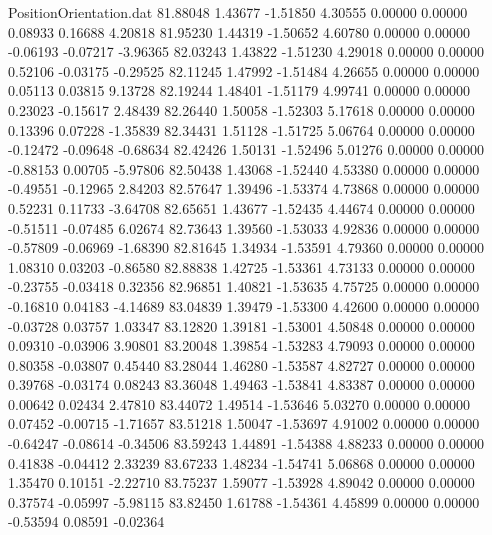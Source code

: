 \begin{filecontents}{PositionOrientation.dat}
  81.88048    1.43677   -1.51850     4.30555    0.00000    0.00000    0.08933    0.16688    4.20818
  81.95230    1.44319   -1.50652     4.60780    0.00000    0.00000   -0.06193   -0.07217   -3.96365
  82.03243    1.43822   -1.51230     4.29018    0.00000    0.00000    0.52106   -0.03175   -0.29525
  82.11245    1.47992   -1.51484     4.26655    0.00000    0.00000    0.05113    0.03815    9.13728
  82.19244    1.48401   -1.51179     4.99741    0.00000    0.00000    0.23023   -0.15617    2.48439
  82.26440    1.50058   -1.52303     5.17618    0.00000    0.00000    0.13396    0.07228   -1.35839
  82.34431    1.51128   -1.51725     5.06764    0.00000    0.00000   -0.12472   -0.09648   -0.68634
  82.42426    1.50131   -1.52496     5.01276    0.00000    0.00000   -0.88153    0.00705   -5.97806
  82.50438    1.43068   -1.52440     4.53380    0.00000    0.00000   -0.49551   -0.12965    2.84203
  82.57647    1.39496   -1.53374     4.73868    0.00000    0.00000    0.52231    0.11733   -3.64708
  82.65651    1.43677   -1.52435     4.44674    0.00000    0.00000   -0.51511   -0.07485    6.02674
  82.73643    1.39560   -1.53033     4.92836    0.00000    0.00000   -0.57809   -0.06969   -1.68390
  82.81645    1.34934   -1.53591     4.79360    0.00000    0.00000    1.08310    0.03203   -0.86580
  82.88838    1.42725   -1.53361     4.73133    0.00000    0.00000   -0.23755   -0.03418    0.32356
  82.96851    1.40821   -1.53635     4.75725    0.00000    0.00000   -0.16810    0.04183   -4.14689
  83.04839    1.39479   -1.53300     4.42600    0.00000    0.00000   -0.03728    0.03757    1.03347
  83.12820    1.39181   -1.53001     4.50848    0.00000    0.00000    0.09310   -0.03906    3.90801
  83.20048    1.39854   -1.53283     4.79093    0.00000    0.00000    0.80358   -0.03807    0.45440
  83.28044    1.46280   -1.53587     4.82727    0.00000    0.00000    0.39768   -0.03174    0.08243
  83.36048    1.49463   -1.53841     4.83387    0.00000    0.00000    0.00642    0.02434    2.47810
  83.44072    1.49514   -1.53646     5.03270    0.00000    0.00000    0.07452   -0.00715   -1.71657
  83.51218    1.50047   -1.53697     4.91002    0.00000    0.00000   -0.64247   -0.08614   -0.34506
  83.59243    1.44891   -1.54388     4.88233    0.00000    0.00000    0.41838   -0.04412    2.33239
  83.67233    1.48234   -1.54741     5.06868    0.00000    0.00000    1.35470    0.10151   -2.22710
  83.75237    1.59077   -1.53928     4.89042    0.00000    0.00000    0.37574   -0.05997   -5.98115
  83.82450    1.61788   -1.54361     4.45899    0.00000    0.00000   -0.53594    0.08591   -0.02364

\end{filecontents}
